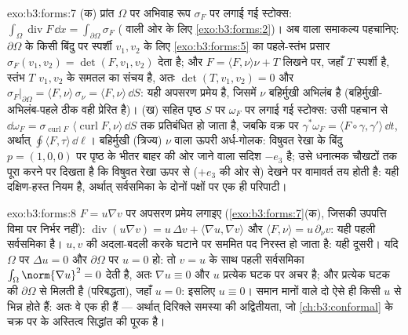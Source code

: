 \begin{solution}{exo:b3:forms:7}
(क)  प्रांत $\Omega$ पर अभिवाह रूप $\sigma_F$ पर लगाई गई
स्टोक्स: $\int_\Omega\operatorname{div}F\,\dd x =
\int_{\partial\Omega}\sigma_F$ ( वाली ओर के लिए
\cref{exo:b3:forms:2})। अब  वाला समाकल्य पहचानिए:
$\partial\Omega$ के किसी बिंदु पर स्पर्शी $v_1, v_2$ के लिए
\cref{exo:b3:forms:5} का पहले-स्तंभ प्रसार
$\sigma_F(v_1, v_2) = \det(F, v_1, v_2)$ देता है; और $F =
\langle F, \nu\rangle\nu + T$ लिखने पर, जहाँ $T$ स्पर्शी है,
स्तंभ $T$ $v_1, v_2$ के समतल का संचय है, अतः $\det(T,
v_1, v_2) = 0$ और
$\sigma_F\vert_{\partial\Omega} = \langle F,
\nu\rangle\,\sigma_\nu = \langle F, \nu\rangle\,\dd S$:
यही अपसरण प्रमेय है, जिसमें $\nu$ बहिर्मुखी अभिलंब है
(बहिर्मुखी-अभिलंब-पहले ठीक वही प्रेरित  है)।
(ख)  सहित पृष्ठ $S$ पर $\omega_F$ पर लगाई गई स्टोक्स:
उसी पहचान से $\dd\omega_F =
\sigma_{\operatorname{curl}F}$ $\langle\operatorname{curl}F,
\nu\rangle\,\dd S$ तक प्रतिबंधित हो जाता है, जबकि 
वक्र पर $\gamma^*\omega_F = \langle F\circ\gamma,
\gamma'\rangle\,\dd t$, अर्थात् $\oint\langle F,
\tau\rangle\,\dd\ell$। बहिर्मुखी (त्रिज्य) $\nu$ वाला ऊपरी
अर्ध-गोलक: विषुवत रेखा के बिंदु $p = (1,0,0)$ पर पृष्ठ के
भीतर बाहर की ओर जाने वाला सदिश $-e_3$ है; उसे धनात्मक
चौखटों तक पूरा करने पर दिखता है कि विषुवत रेखा ऊपर से
($+e_3$ की ओर से) देखने पर वामावर्त तय होती है: यही
दक्षिण-हस्त नियम है, अर्थात् सर्वसमिका के दोनों पक्षों पर एक
ही परिपाटी।
\end{solution}

\begin{solution}{exo:b3:forms:8}
$F = u\nabla v$ पर अपसरण प्रमेय लगाइए
(\cref{exo:b3:forms:7}(क), जिसकी उपपत्ति विमा पर निर्भर
नहीं): $\operatorname{div}(u\nabla v) = u\,\Delta v +
\langle\nabla u, \nabla v\rangle$ और $\langle F, \nu\rangle =
u\,\partial_\nu v$: यही पहली सर्वसमिका है। $u, v$ की
अदला-बदली करके घटाने पर सममित पद निरस्त हो जाता है: यही
दूसरी। यदि $\Omega$ पर $\Delta u = 0$ और $\partial\Omega$ पर
$u = 0$ हो: तो $v = u$ के साथ पहली सर्वसमिका
$\int_\Omega\norm{\nabla u}^2 = 0$ देती है, अतः $\nabla u
\equiv 0$ और $u$ प्रत्येक घटक पर अचर है; और प्रत्येक घटक की
 $\partial\Omega$ से मिलती है (परिबद्धता), जहाँ $u =
0$: इसलिए $u \equiv 0$। समान  मानों वाले दो  ऐसे ही किसी $u$ से भिन्न होते हैं: अतः वे एक ही हैं ---
अर्थात् दिरिक्ले समस्या की अद्वितीयता, जो
\cref{ch:b3:conformal} के चक्र पर के अस्तित्व सिद्धांत की
पूरक है।
\end{solution}

